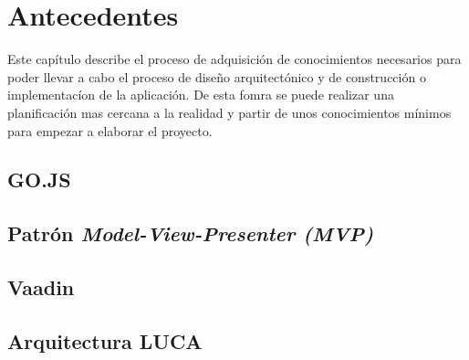  \chapter{Antecedentes}

Este capítulo describe el proceso de adquisición de conocimientos necesarios para poder llevar a cabo el proceso de diseño arquitectónico y de construcción o implementacíon de la aplicación. De esta fomra se puede realizar una planificación mas cercana a la realidad y partir de unos conocimientos mínimos para empezar a elaborar el proyecto.
	
\minitoc
	
\section{GO.JS}



\section{Patrón \emph{Model-View-Presenter (MVP)}}
\label{sec:mvp}



\section{Vaadin}
 		

 			
\section{Arquitectura LUCA}

	
	

	
	
